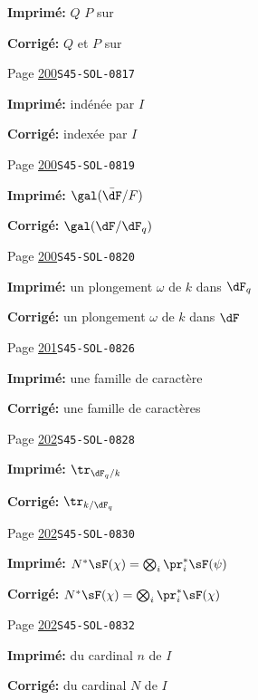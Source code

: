 \begin{description}
\par\noindent\textbf{Imprimé:} $Q$ $P$ sur
\par\noindent\textbf{Corrigé:} $Q$ et $P$ sur
\smallskip
\item[\hypertarget{apparatus:FR-0181}{181}] Page \hyperlink{printpage:fr:200}{200}\quad\texttt{S45-SOL-0817}
\par\noindent\textbf{Imprimé:} indénée par $I$
\par\noindent\textbf{Corrigé:} indexée par $I$
\smallskip
\item[\hypertarget{apparatus:FR-0182}{182}] Page \hyperlink{printpage:fr:200}{200}\quad\texttt{S45-SOL-0819}
\par\noindent\textbf{Imprimé:} \(\gal(\bar\dF/F)\)
\par\noindent\textbf{Corrigé:} \(\gal(\dF/\dF_q)\)
\smallskip
\item[\hypertarget{apparatus:FR-0183}{183}] Page \hyperlink{printpage:fr:200}{200}\quad\texttt{S45-SOL-0820}
\par\noindent\textbf{Imprimé:} un plongement $\omega$ de $k$ dans $\dF_q$
\par\noindent\textbf{Corrigé:} un plongement $\omega$ de $k$ dans $\dF$
\smallskip
\item[\hypertarget{apparatus:FR-0184}{184}] Page \hyperlink{printpage:fr:201}{201}\quad\texttt{S45-SOL-0826}
\par\noindent\textbf{Imprimé:} une famille de caractère
\par\noindent\textbf{Corrigé:} une famille de caractères
\smallskip
\item[\hypertarget{apparatus:FR-0185}{185}] Page \hyperlink{printpage:fr:202}{202}\quad\texttt{S45-SOL-0828}
\par\noindent\textbf{Imprimé:} \(\tr_{\dF_q/k}\)
\par\noindent\textbf{Corrigé:} \(\tr_{k/\dF_q}\)
\smallskip
\item[\hypertarget{apparatus:FR-0186}{186}] Page \hyperlink{printpage:fr:202}{202}\quad\texttt{S45-SOL-0830}
\par\noindent\textbf{Imprimé:} \(N^\ast\sF(\chi) = \bigotimes_i \pr_i^\ast\sF(\psi)\)
\par\noindent\textbf{Corrigé:} \(N^\ast\sF(\chi) = \bigotimes_i \pr_i^\ast\sF(\chi)\)
\smallskip
\item[\hypertarget{apparatus:FR-0187}{187}] Page \hyperlink{printpage:fr:202}{202}\quad\texttt{S45-SOL-0832}
\par\noindent\textbf{Imprimé:} du cardinal $n$ de $I$
\par\noindent\textbf{Corrigé:} du cardinal $N$ de $I$

\end{description}
